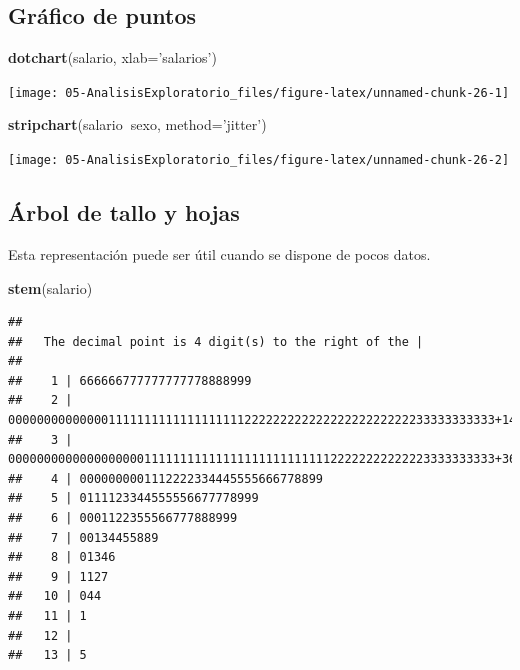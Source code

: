 \documentclass[]{book}
\newenvironment{Shaded}{\begin{snugshade}}{\end{snugshade}}
\newcommand{\KeywordTok}[1]{\textcolor[rgb]{0.13,0.29,0.53}{\textbf{#1}}}
\newcommand{\DataTypeTok}[1]{\textcolor[rgb]{0.13,0.29,0.53}{#1}}
\newcommand{\StringTok}[1]{\textcolor[rgb]{0.31,0.60,0.02}{#1}}
\newcommand{\OperatorTok}[1]{\textcolor[rgb]{0.81,0.36,0.00}{\textbf{#1}}}
\newcommand{\NormalTok}[1]{#1}
\begin{document}
\subsection{Gráfico de puntos}\label{grafico-de-puntos}

\begin{Shaded}
\begin{Highlighting}[]
\KeywordTok{dotchart}\NormalTok{(salario, }\DataTypeTok{xlab=}\StringTok{'salarios'}\NormalTok{)}
\end{Highlighting}
\end{Shaded}

\begin{center}\texttt{[image: 05-AnalisisExploratorio\_files/figure-latex/unnamed-chunk-26-1]} \end{center}

\begin{Shaded}
\begin{Highlighting}[]
\KeywordTok{stripchart}\NormalTok{(salario}\OperatorTok{~}\NormalTok{sexo, }\DataTypeTok{method=}\StringTok{'jitter'}\NormalTok{)}
\end{Highlighting}
\end{Shaded}

\begin{center}\texttt{[image: 05-AnalisisExploratorio\_files/figure-latex/unnamed-chunk-26-2]} \end{center}

\subsection{Árbol de tallo y hojas}\label{arbol-de-tallo-y-hojas}

Esta representación puede ser útil cuando se dispone de pocos datos.

\begin{Shaded}
\begin{Highlighting}[]
\KeywordTok{stem}\NormalTok{(salario)}
\end{Highlighting}
\end{Shaded}

\begin{verbatim}
## 
##   The decimal point is 4 digit(s) to the right of the |
## 
##    1 | 666666777777777778888999
##    2 | 00000000000000111111111111111111122222222222222222222222233333333333+148
##    3 | 00000000000000000001111111111111111111111111122222222222223333333333+36
##    4 | 0000000001112222334445555666778899
##    5 | 0111123344555556677778999
##    6 | 0001122355566777888999
##    7 | 00134455889
##    8 | 01346
##    9 | 1127
##   10 | 044
##   11 | 1
##   12 | 
##   13 | 5
\end{verbatim}
\end{document}
